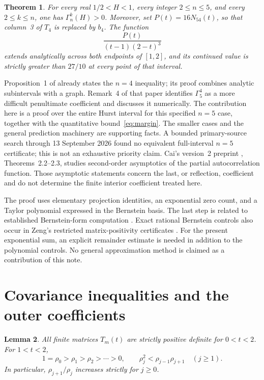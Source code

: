 \documentclass[11pt]{article}
\newtheorem{theorem}{Theorem}
\newtheorem{lemma}[theorem]{Lemma}
\begin{document}
\begin{theorem}\label{thm:main}
For every real $1/2<H<1$, every integer $2\le n\le5$, and every
$2\le k\le n$, one has $\Gamma_n^k(H)>0$.
Moreover, set $P(t)=16N_{54}(t)$, so that column~3 of $T_4$ is replaced
by $b_4$. The function
\begin{equation}\label{eq:margin}
 \frac{P(t)}{(t-1)(2-t)^3}
\end{equation}
extends analytically across both endpoints of $[1,2]$, and its continued
value is strictly greater than $27/10$ at every point of that interval.
\end{theorem}

Proposition~1 of \cite{Bodnarchuk2025} already states the $n=4$
inequality; its proof combines analytic subintervals with a graph.
Remark~4 of that paper identifies $\Gamma_5^4$ as a more difficult
penultimate coefficient and discusses it numerically. The contribution
here is a proof over the entire Hurst interval for this specified $n=5$
case, together with the quantitative bound~\eqref{eq:margin}. The
smaller cases and the general prediction machinery are supporting facts.
A bounded primary-source search through 13 September 2026 found no
equivalent full-interval $n=5$ certificate; this is not an exhaustive
priority claim. Cai's version~2 preprint \cite{Cai2026}, Theorems~2.2--2.3,
studies second-order asymptotics of the partial autocorrelation function.
Those asymptotic statements concern the last, or reflection, coefficient
and do not determine the finite interior coefficient treated here.

The proof uses elementary projection identities, an exponential zero
count, and a Taylor polynomial expressed in the Bernstein basis. The
last step is related to established Bernstein-form computation
\cite{FaroukiRajan1988}. Exact rational Bernstein controls also occur in
Zeng's restricted matrix-positivity certificates
\cite[Theorem~10 and equations~(8.25)--(8.27)]{Zeng2026Lens}.
For the present exponential sum, an explicit remainder estimate is
needed in addition to the polynomial controls. No general approximation
method is claimed as a contribution of this note.

\section{Covariance inequalities and the outer coefficients}

\begin{lemma}\label{lem:covariance}
All finite matrices $T_m(t)$ are strictly positive definite for $0<t<2$.
For $1<t<2$,
\[
 1=\rho_0>\rho_1>\rho_2>\cdots>0,
 \qquad \rho_j^2<\rho_{j-1}\rho_{j+1}\quad(j\ge1).
\]
In particular, $\rho_{j+1}/\rho_j$ increases strictly for $j\ge0$.
\end{lemma}
\end{document}
